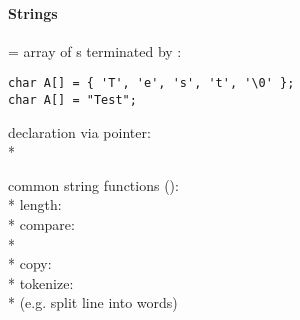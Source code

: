 \paragraph{Strings}
\begin{items}
  \item = array of s terminated by :
  \begin{lstlisting}[style=customc]
char A[] = { 'T', 'e', 's', 't', '\0' };
char A[] = "Test";
  \end{lstlisting}
  \item declaration via pointer: \\*
  \item common string functions (): \\*
    length:  \\*
    compare: \\* \phantom{x}  \\*
    copy:  \\*
    tokenize:  \\* \phantom{x} (e.g. split line into words)
\end{items}

